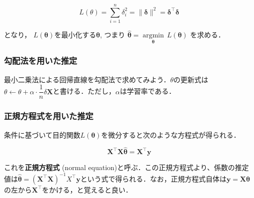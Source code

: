 \begin{equation}
L(\theta)=\sum_{i=1}^n \delta_i^2 = \|\mathbf{\delta}\|^2=\mathbf{\delta}^\top \mathbf{\delta}
\end{equation}


となり， $L(\mathbf{\theta})$を最小化する$\mathbf{\theta}$, つまり $\hat {\mathbf {\theta }}={\underset {\mathbf {\theta}}{\operatorname {arg min} }}\,L({\mathbf{\theta}})$
を求める．
\subsubsection{勾配法を用いた推定}
最小二乗法による回帰直線を勾配法で求めてみよう．$\theta$の更新式は$\theta \leftarrow \theta + \alpha\cdot \dfrac{1}{n} \delta \mathbf{X}$と書ける．ただし，$\alpha$は学習率である．






\subsubsection{正規方程式を用いた推定}
条件に基づいて目的関数$L(\mathbf{\theta})$を微分すると次のような方程式が得られる．


\begin{equation}
\mathbf{X}^\top\mathbf{X}\mathbf{\hat\theta}=\mathbf{X}^\top\mathbf{y}
\end{equation}


これを\textbf{正規方程式} (normal equation)と呼ぶ．この正規方程式より、係数の推定値は$\mathbf{\hat\theta}={(\mathbf{X}^\top\mathbf{X})}^{-1}X^\top\mathbf{y}$という式で得られる．なお，正規方程式自体は$\mathbf{y}=\mathbf{X}\mathbf{\theta}$の左から$\mathbf{X}^\top$をかける，と覚えると良い．



